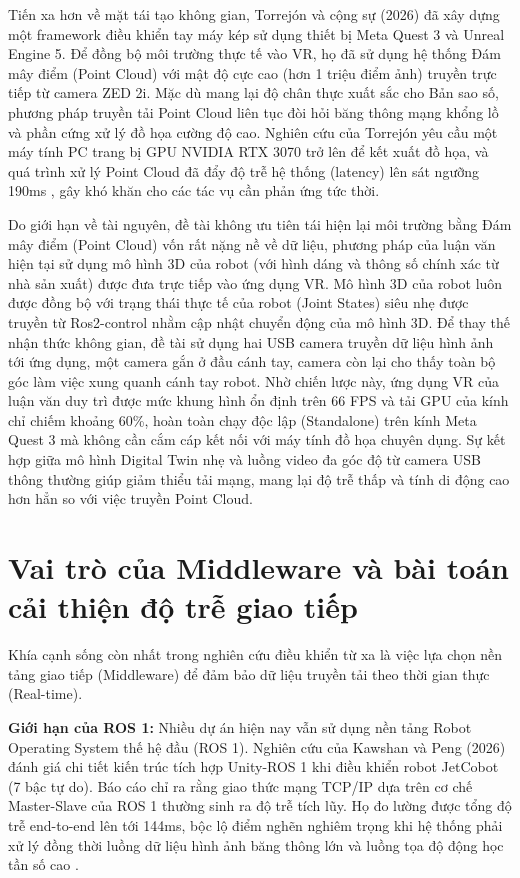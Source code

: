 Tiến xa hơn về mặt tái tạo không gian, Torrejón và cộng sự (2026) \cite{torrejon2026teleoperation} đã xây dựng một framework điều khiển tay máy kép sử dụng thiết bị Meta Quest 3 và Unreal Engine 5. Để đồng bộ môi trường thực tế vào VR, họ đã sử dụng hệ thống Đám mây điểm (Point Cloud) với mật độ cực cao (hơn 1 triệu điểm ảnh) truyền trực tiếp từ camera ZED 2i. Mặc dù mang lại độ chân thực xuất sắc cho Bản sao số, phương pháp truyền tải Point Cloud liên tục đòi hỏi băng thông mạng khổng lồ và phần cứng xử lý đồ họa cường độ cao. Nghiên cứu của Torrejón yêu cầu một máy tính PC trang bị GPU NVIDIA RTX 3070 trở lên để kết xuất đồ họa, và quá trình xử lý Point Cloud đã đẩy độ trễ hệ thống (latency) lên sát ngưỡng 190ms \cite{torrejon2026teleoperation}, gây khó khăn cho các tác vụ cần phản ứng tức thời.

Do giới hạn về tài nguyên, đề tài không ưu tiên tái hiện lại môi trường bằng Đám mây điểm (Point Cloud) vốn rất nặng nề về dữ liệu, phương pháp của luận văn hiện tại sử dụng mô hình 3D của robot (với hình dáng và thông số chính xác từ nhà sản xuất) được đưa trực tiếp vào ứng dụng VR. Mô hình 3D của robot luôn được đồng bộ với trạng thái thực tế của robot (Joint States) siêu nhẹ được truyền từ Ros2-control nhằm cập nhật chuyển động của mô hình 3D. Để thay thế nhận thức không gian, đề tài sử dụng hai USB camera truyền dữ liệu hình ảnh tới ứng dụng, một camera gắn ở đầu cánh tay, camera còn lại cho thấy toàn bộ góc làm việc xung quanh cánh tay robot. Nhờ chiến lược này, ứng dụng VR của luận văn duy trì được mức khung hình ổn định trên 66 FPS và tải GPU của kính chỉ chiếm khoảng 60\%, hoàn toàn chạy độc lập (Standalone) trên kính Meta Quest 3 mà không cần cắm cáp kết nối với máy tính đồ họa chuyên dụng. Sự kết hợp giữa mô hình Digital Twin nhẹ và luồng video đa góc độ từ camera USB thông thường giúp giảm thiểu tải mạng, mang lại độ trễ thấp và tính di động cao hơn hẳn so với việc truyền Point Cloud.

\section{Vai trò của Middleware và bài toán cải thiện độ trễ giao tiếp}

Khía cạnh sống còn nhất trong nghiên cứu điều khiển từ xa là việc lựa chọn nền tảng giao tiếp (Middleware) để đảm bảo dữ liệu truyền tải theo thời gian thực (Real-time).

\textbf{Giới hạn của ROS 1:} Nhiều dự án hiện nay vẫn sử dụng nền tảng Robot Operating System thế hệ đầu (ROS 1). Nghiên cứu của Kawshan và Peng (2026) \cite{kawshan2026digital} đánh giá chi tiết kiến trúc tích hợp Unity-ROS 1 khi điều khiển robot JetCobot (7 bậc tự do). Báo cáo chỉ ra rằng giao thức mạng TCP/IP dựa trên cơ chế Master-Slave của ROS 1 thường sinh ra độ trễ tích lũy. Họ đo lường được tổng độ trễ end-to-end lên tới 144ms, bộc lộ điểm nghẽn nghiêm trọng khi hệ thống phải xử lý đồng thời luồng dữ liệu hình ảnh băng thông lớn và luồng tọa độ động học tần số cao \cite{kawshan2026digital}. 

